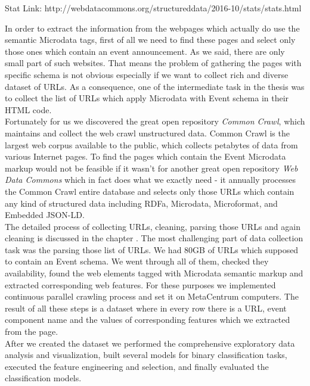 Stat Link: http://webdatacommons.org/structureddata/2016-10/stats/stats.html  

 
In order to extract the information from the webpages which actually do use the semantic Microdata tags, first of all we need to find these pages and select only those ones which contain an event announcement. As we said, there are only small part of such websites. That means the problem of gathering the pages with specific schema is not obvious especially if we want to collect rich and diverse dataset of URLs. As a consequence, one of the intermediate task in the thesis was to collect the list of URLs which apply Microdata with Event schema in their HTML code. \\

Fortunately for us we discovered the great open repository \textit{Common Crawl}, which maintains and collect the web crawl unstructured data. Common Crawl is the largest web corpus available to the public, which collects petabytes of data from various Internet pages. To find the pages which contain the Event Microdata markup would not be feasible if it wasn't for another great open repository \textit{Web Data Commons} which in fact does what we exactly need - it annually processes the Common Crawl entire database and selects only those URLs which contain any kind of structured data including RDFa, Microdata, Microformat, and Embedded JSON-LD. \\

The detailed process of collecting URLs, cleaning, parsing those URLs and again cleaning is discussed in the chapter . The most challenging part of data collection task was the parsing those list of URLs. We had 80GB of URLs which supposed to contain an Event schema. We went through all of them, checked they availability, found the web elements tagged with Microdata semantic markup and extracted corresponding web features. For these purposes we implemented continuous parallel crawling process and set it on MetaCentrum computers. The result of all these steps is a dataset where in every row there is a URL, event component name and the values of corresponding features which we extracted from the page.\\ 

After we created the dataset we performed the comprehensive exploratory data analysis and visualization, built several models for binary classification tasks, executed the feature engineering and selection, and finally evaluated the classification models.    

